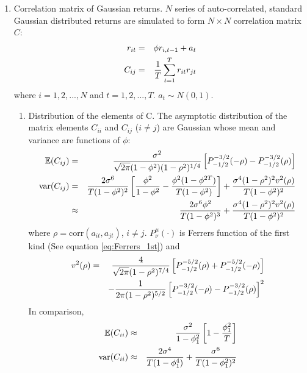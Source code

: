 \documentclass{report}
\begin{document}
\begin{enumerate}
\begin{enumerate}
  \end{enumerate}
\item Correlation matrix of Gaussian returns. $N$ series of
  auto-correlated, standard Gaussian distributed returns are simulated
  to form $N\times N$ correlation matrix $C$:
  \begin{eqnarray*}
    r_{it} &=& \phi r_{i,t-1} + a_t \\
    C_{ij} &=& {1 \over T} \sum_{t=1}^T r_{it} r_{jt}
  \end{eqnarray*}
  where $i = 1, 2, ..., N$ and $t = 1,2, ..., T$. $a_t \sim N(0,
  1)$.
  \begin{enumerate}
  \item Distribution of the elements of C. The asymptotic distribution
    of the matrix elements $C_{ii}$ and $C_{ij}$ ($i \neq j$) are 
    Gaussian whose mean and variance are functions of $\phi$:
    \begin{eqnarray*}
      \mathbb{E}(C_{ij}) &=& {\sigma^2 \over \sqrt{2\pi} (1 - \phi^2)(1 -
        \rho^2)^{1/4}} \left[ P^{-3/2}_{-1/2}(-\rho) -
        P^{-3/2}_{-1/2}(\rho)
      \right] \\
      \text{var}(C_{ij}) &=& {2 \sigma^6 \over T (1 - \phi^2)^2} \left[
        {\phi^2 \over 1 - \phi^2} -
        {\phi^2 (1 - \phi^{2T}) \over
          T(1 - \phi^2)}
      \right] + {\sigma^4 (1 - \rho^2)^2 v^2(\rho) \over
        T (1 - \phi^2)^2} \\
      &\approx& {2 \sigma^6 \phi^2 \over T (1 - \phi^2)^3}
      + {\sigma^4 (1 - \rho^2)^2 v^2(\rho) \over
        T (1 - \phi^2)^2}
    \end{eqnarray*}
    where $\rho = \text{corr}(a_{it}, a_{jt})$, $i \neq
    j$. $P^\mu_\nu(\cdot)$ is Ferrers function of the first kind (See
    equation \ref{eq:Ferrers_1st}) and
    \begin{eqnarray*}
      v^2(\rho) &=&
      {4 \over \sqrt{2\pi} (1 - \rho^2)^{7/4}} \left[
        P^{-5/2}_{-1/2}(\rho) + P^{-5/2}_{-1/2}(-\rho)
      \right] \\
      && - {1 \over 2\pi (1 - \rho^2)^{5/2}} \left[
        P^{-3/2}_{-1/2}(-\rho) - P^{-3/2}_{-1/2}(\rho)
      \right]^2
    \end{eqnarray*}
    In comparison,
    \begin{eqnarray*}
      \mathbb{E}(C_{ii}) & \approx & {\sigma^2 \over 1 - \phi_1^2} \left[
        1 - {\phi_1^2 \over T}
      \right] \\
      \text{var}(C_{ii}) &\approx& {2 \sigma^4 \over T (1 - \phi_1^4)} +
      {\sigma^6 \over T (1 -\phi_1^2)^2}
    \end{eqnarray*}


\end{enumerate}
\end{enumerate}
\end{document}
